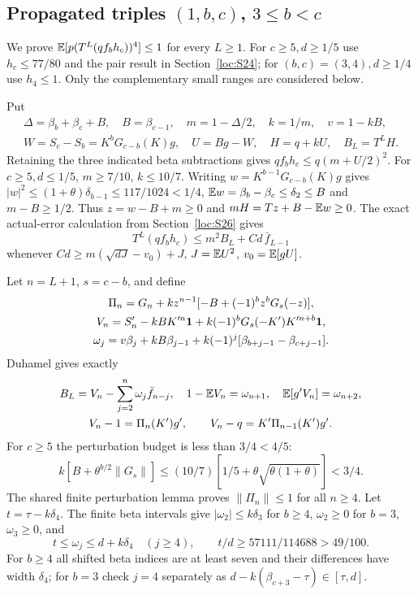 \subsection[Propagated triples (1,b,c), 3 <= b<c]{Propagated triples $(1,b,c)$, $3\le b<c$}\label{loc:S31}
We prove $\mathbb E[p(T^L(qf_bh_c))^4]\le1$ for every $L\ge1$.
For $c\ge5,d\ge1/5$ use $h_c\le77/80$ and the pair result in
Section~\ref{loc:S24}; for $(b,c)=(3,4),d\ge1/4$ use $h_4\le1$.
Only the complementary small ranges are considered below.

Put
\begin{gather*}
 \Delta=\beta_b+\beta_c+B,\quad B=\beta_{c-1},\quad
 m=1-\Delta/2,\quad k=1/m,\quad v=1-kB,\\
 W=S_c-S_b=K^bG_{c-b}(K)g,\quad U=Bg-W,\quad H=q+kU,\quad B_L=T^LH.
\end{gather*}
Retaining the three indicated beta subtractions gives
$qf_bh_c\le q(m+U/2)^2$.
For $c\ge5,d\le1/5$, $m\ge7/10$, $k\le10/7$.
Writing $w=K^{b-1}G_{c-b}(K)g$ gives
$|w|^2\le(1+\theta)\delta_{b-1}\le117/1024<1/4$,
$\mathbb E w=\beta_b-\beta_c\le \delta_{2}\le B$ and $m-B\ge1/2$.
Thus $z=w-B+m\ge0$ and $mH=Tz+B-\mathbb E w\ge0$.
The exact actual-error calculation from Section~\ref{loc:S26} gives
\begin{equation}\label{eq:compact-1bc-error}
 T^L(qf_bh_c)\le m^2B_L+Cd\,\bar f_{L-1}
\end{equation}
whenever $Cd\ge m(\sqrt{dJ}-v_0)+J$, $J=\mathbb E U^2$, $v_0=\mathbb E[gU]$.

Let $n=L+1$, $s=c-b$, and define
\begin{gather*}
 \Pi_n=G_n+kz^{n-1}[-B+(-1)^bz^bG_s(-z)],\\
 V_n=S'_n-kBK'^n\mathbf1+k(-1)^bG_s(-K')K'^{n+b}\mathbf1,\\
 \omega_j=v\beta_j+kB\beta_{j-1}
                  +k(-1)^j[\beta_{b+j-1}-\beta_{c+j-1}].
\end{gather*}
Duhamel gives exactly
\begin{gather*}
 B_L=V_n-\sum_{j=2}^n\omega_j\bar f_{n-j},\quad
 1-\mathbb E V_n=\omega_{n+1},\quad\mathbb E[g'V_n]=\omega_{n+2},\\
 V_n-1=\Pi_n(K')g',\qquad V_n-q=K'\Pi_{n-1}(K')g'.
\end{gather*}
For $c\ge5$ the perturbation budget is less than $3/4<4/5$:
\[
 k[B+\theta^{b/2}\|G_s\|]
 \le(10/7)[1/5+\theta\sqrt{\theta(1+\theta)}]<3/4.
\]
The shared finite perturbation lemma proves $\|\Pi_n\|\le1$ for all $n\ge4$.
Let $t=\tau-k\delta_{4}$. The finite beta intervals give
$|\omega_2|\le k\delta_{3}$ for $b\ge4$, $\omega_2\ge0$ for $b=3$,
$\omega_3\ge0$, and
\[
 t\le\omega_j\le d+k\delta_{4}\quad(j\ge4),\qquad
 t/d\ge57111/114688>49/100.
\]
For $b\ge4$ all shifted beta indices are at least seven and their
differences have width $\delta_{4}$; for $b=3$ check $j=4$ separately as
$d-k(\beta_{c+3}-\tau)\in[\tau,d]$.

